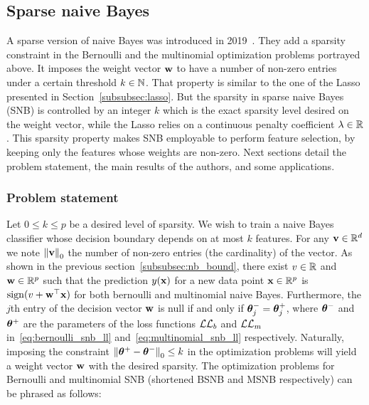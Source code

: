\subsection{Sparse naive Bayes}\label{subsec:snb}

A sparse version of naive Bayes was introduced in 2019~\cite{sparse_naive_bayes}.
They add a sparsity constraint in the Bernoulli and the multinomial optimization problems portrayed above.
It imposes the weight vector $\mathbf{w}$ to have a number of non-zero entries under a certain threshold $k \in \mathbb{N}$.
That property is similar to the one of the Lasso presented in Section~\ref{subsubsec:lasso}.
But the sparsity in sparse naive Bayes (SNB) is controlled by an integer $k$ which is
the exact sparsity level desired on the weight vector,
while the Lasso relies on a continuous penalty coefficient $\lambda \in \mathbb{R}$.
This sparsity property makes SNB employable to perform feature selection,
by keeping only the features whose weights are non-zero.
Next sections detail the problem statement, the main results of the authors,
and some applications.

\subsubsection{Problem statement}\label{subsubsec:snb_ps}

Let $0 \leq k \leq p$ be a desired level of sparsity.
We wish to train a naive Bayes classifier whose decision boundary depends on at most $k$ features.
For any $\mathbf{v} \in \mathbb{R}^d$ we note $\left\lVert\mathbf{v}\right\rVert_0$ the number of non-zero entries
(the cardinality) of the vector.
As shown in the previous section~\ref{subsubsec:nb_bound},
there exist $v \in \mathbb{R}$ and $\mathbf{w} \in \mathbb{R}^p$ such that the prediction $y(\mathbf{x})$ for a new data point $\mathbf{x}\in\mathbb{R}^p$ is
$\operatorname*{sign}(v + \mathbf{w}^\top\mathbf{x})$ for both bernoulli and multinomial naive Bayes.
Furthermore, the $j$th entry of the decision vector $\mathbf{w}$ is null if and only if $\bm{\theta}^-_j = \bm{\theta}^+_j$,
where $\bm{\theta}^-$ and $\bm{\theta}^+$ are the parameters of the loss functions $\mathcal{L}\mathcal{L}_b$ and $\mathcal{L}\mathcal{L}_m$
in~\ref{eq:bernoulli_snb_ll} and~\ref{eq:multinomial_snb_ll} respectively.
Naturally, imposing the constraint $\left\lVert\bm{\theta}^+ - \bm{\theta}^-\right\rVert_0 \leq k$ in the optimization problems
will yield a weight vector $\mathbf{w}$ with the desired sparsity.
The optimization problems for Bernoulli and multinomial SNB
(shortened BSNB and MSNB respectively) can be phrased as follows:

